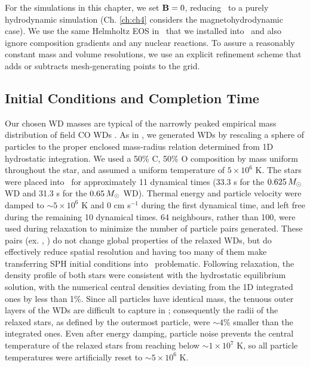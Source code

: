 
For the simulations in this chapter, we set ${\bf B} = 0$, reducing \arepo\ to a purely hydrodynamic simulation (Ch. \ref{ch:ch4} considers the magnetohydrodynamic case).  We use the same Helmholtz EOS in \arepo\ that we installed into \gasoline\ and also ignore composition gradients and any nuclear reactions.  To assure a reasonably constant mass and volume resolutions, we use an explicit refinement scheme \citep{voge+12} that adds or subtracts mesh-generating points to the grid.  


\subsection{Initial Conditions and Completion Time}
\label{ssec:c3_initcond}

Our chosen WD masses are typical of the narrowly peaked empirical mass distribution of field CO WDs \citep{tremb09, klei+13}.  As in \citeal{zhu+13}, we generated WDs by rescaling a sphere of particles to the proper enclosed mass-radius relation determined from 1D hydrostatic integration.  We used a 50\% C, 50\% O composition by mass uniform throughout the star, and assumed a uniform temperature of $5\times 10^6$ K.  The stars were placed into \gasoline\ for approximately 11 dynamical times (33.3 s for the $0.625\,\Msun$ WD and 31.3 s for the $0.65\,\Msun$ WD).  Thermal energy and particle velocity were damped to $\sim 5 \times 10^6$ K and 0 cm s$^{-1}$ during the first dynamical time, and left free during the remaining 10 dynamical times.  64 neighbours, rather than 100, were used during relaxation to minimize the number of particle pairs generated.  These pairs (ex. \citealt{dehna12}, \citealt{spri10rev}) do not change global properties of the relaxed WDs, but do effectively reduce spatial resolution and having too many of them make transferring SPH initial conditions into \arepo\ problematic.  Following relaxation, the density profile of both stars were consistent with the hydrostatic equilibrium solution, with the numerical central densities deviating from the 1D integrated ones by less than 1\%.  Since all particles have identical mass, the tenuous outer layers of the WDs are difficult to capture in \gasoline; consequently the radii of the relaxed stars, as defined by the outermost particle, were $\sim 4$\% smaller than the integrated ones.  Even after energy damping, particle noise prevents the central temperature of the relaxed stars from reaching below $\sim 1\times 10^7$ K, so all particle temperatures were artificially reset to $\sim 5 \times 10^6$ K.

